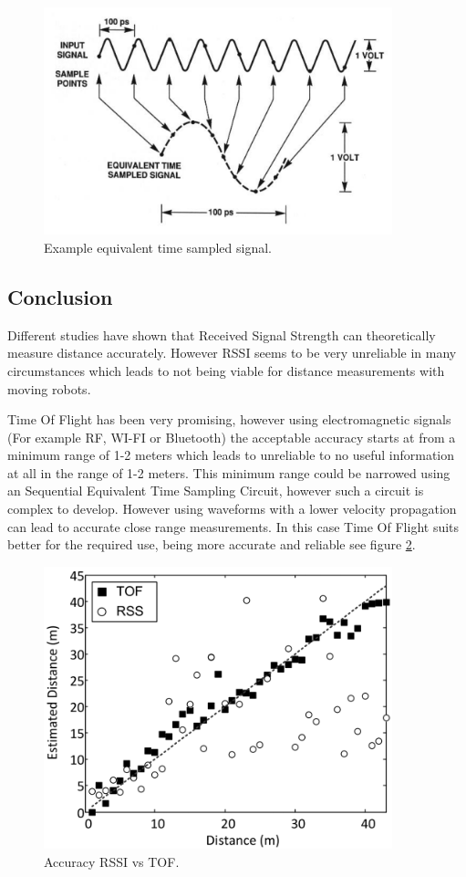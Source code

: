 \documentclass[10pt,a4paper]{article}
\begin{document}
\begin{figure}[H]
\centering
\includegraphics[width=0.9\textwidth]{SETS2.png}
\caption{Example equivalent time sampled signal.\cite{SETS}} 
\label{SETS2}
\end{figure}
\newpage

\subsection{Conclusion}
Different studies have shown that Received Signal Strength can theoretically measure distance accurately. However RSSI seems to be very unreliable in many circumstances which leads to not being viable for distance measurements with moving robots. 

Time Of Flight has been very promising, however using electromagnetic signals (For example RF, WI-FI or Bluetooth) the acceptable accuracy starts at from a minimum range of 1-2 meters which leads to unreliable to no useful information at all in the range of 1-2 meters. This minimum range could be narrowed using an Sequential Equivalent Time Sampling Circuit, however such a circuit is complex to develop. However using waveforms with a lower velocity propagation can lead to accurate close range measurements. In this case Time Of Flight suits better for the required use, being more accurate and reliable see figure \ref{RSSIvsTOF}.\cite{TOF}

\begin{figure}[H]
\centering
\includegraphics[width=0.9\textwidth]{RSSIvsTOF.pdf}
\caption{Accuracy RSSI vs TOF.\cite{TOF}} 
\label{RSSIvsTOF}
\end{figure}
\end{document}
